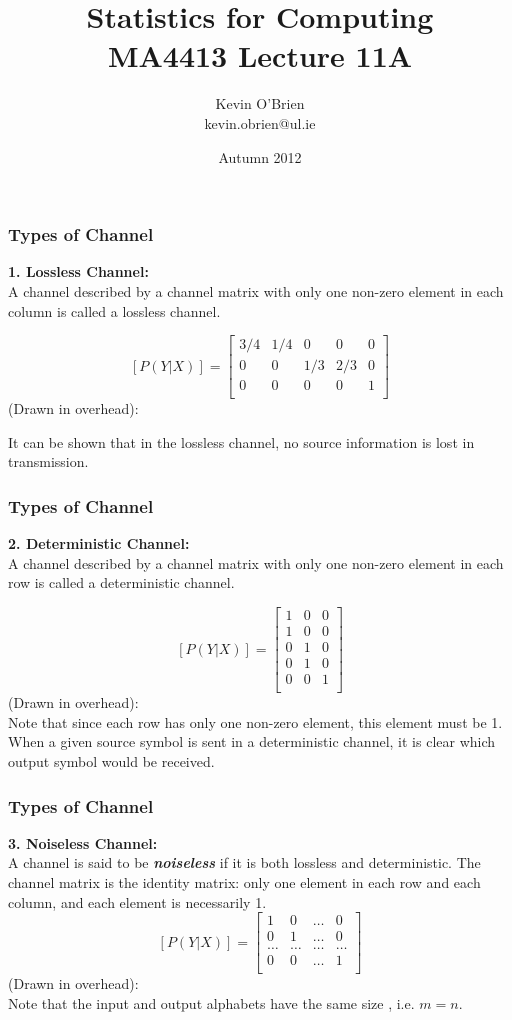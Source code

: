 \documentclass[a4]{beamer}
\title[MA4413]{Statistics for Computing \\ {\normalsize MA4413 Lecture 11A}}
\author[Kevin O'Brien]{Kevin O'Brien \\ {\scriptsize kevin.obrien@ul.ie}}
\date{Autumn 2012}
\institute[Maths \& Stats]{Dept. of Mathematics \& Statistics, \\ University \textit{of} Limerick}
\begin{document}

\frametitle{Types of Channel}
\textbf{ 1. Lossless Channel:}\\
A channel described by a channel matrix with only one non-zero element in each column is called a lossless channel.


\[  [P(Y|X)]  =  \left[ \begin{array}{ccccc}
3/4 & 1/4 &0 & 0&0\\
0  & 0 &1/3 & 2/3& 0\\
0  & 0& 0&0 &1 \\
\end{array} \right]  \]
(Drawn in overhead):\\ \bigskip

It can be shown that in the lossless channel, no source information is lost in transmission.



\frametitle{Types of Channel}
\textbf{2. Deterministic Channel:}\\
A channel described by a channel matrix with only one non-zero element in each row is called a deterministic channel.

\[  [P(Y|X)]  =  \left[ \begin{array}{ccc}
1   & 0 &0 \\
1  & 0 &0\\
0  & 1 &0\\
0  & 1& 0 \\
0  & 0& 1 \\
\end{array} \right]  \]
(Drawn in overhead):\\ \bigskip
Note that since each row has only one non-zero element, this element must be 1. When a given source symbol is sent in a deterministic channel, it is clear which output symbol would be received.



\frametitle{Types of Channel}
\textbf{3. Noiseless Channel:}\\
A channel is said to be \emph{\textbf{noiseless}} if it is both lossless and deterministic.
The channel matrix is the identity matrix: only one element in each row and each column, and each element is necessarily 1.
\[  [P(Y|X)]  = \left[ \begin{array}{cccc}
1 &0 & \ldots & 0 \\
0 & 1& \ldots & 0 \\
\ldots & \ldots & \ldots & \ldots \\
0& 0 & \ldots & 1 \\
\end{array} \right] \]
(Drawn in overhead):\\ \bigskip
Note that the input and output alphabets have the same size , i.e. $m=n$.
\end{document}
